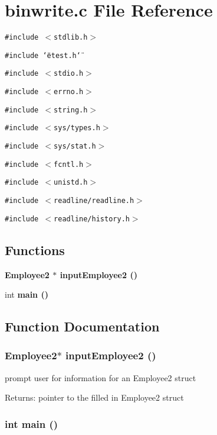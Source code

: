 \section{binwrite.c File Reference}
\label{binwrite_8c}
{\tt \#include $<$stdlib.h$>$}\par
{\tt \#include \char`\"{}etest.h\char`\"{}}\par
{\tt \#include $<$stdio.h$>$}\par
{\tt \#include $<$errno.h$>$}\par
{\tt \#include $<$string.h$>$}\par
{\tt \#include $<$sys/types.h$>$}\par
{\tt \#include $<$sys/stat.h$>$}\par
{\tt \#include $<$fcntl.h$>$}\par
{\tt \#include $<$unistd.h$>$}\par
{\tt \#include $<$readline/readline.h$>$}\par
{\tt \#include $<$readline/history.h$>$}\par
\subsection*{Functions}
\begin{CompactItemize}
\item 
\bf{Employee2} $\ast$ \bf{input\-Employee2} ()
\item 
int \bf{main} ()
\end{CompactItemize}


\subsection{Function Documentation}
\subsubsection{\setlength{\rightskip}{0pt plus 5cm}\bf{Employee2}$\ast$ input\-Employee2 ()}\label{binwrite_8c_4bbd1151cc7051aa5bf412b4b7a75c85}


prompt user for information for an Employee2 struct \begin{Desc}
\item[Returns:]pointer to the filled in Employee2 struct \end{Desc}
\subsubsection{\setlength{\rightskip}{0pt plus 5cm}int main ()}\label{binwrite_8c_e66f6b31b5ad750f1fe042a706a4e3d4}


